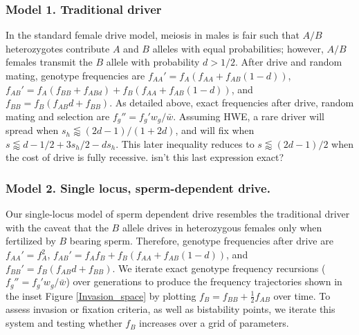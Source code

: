 \documentclass[12pt,letterpaper]{article}
\newcommand{\gc}[1]{{ \color{red} #1}}
\newcommand{\yb}[1]{{ \color{blue} #1}}
\begin{document}
\subsubsection*{Model 1. Traditional driver}
In the standard female drive model, meiosis in males is fair such that $A/B$ heterozygotes contribute $A$ and $B$ alleles with equal probabilities; however, $A/B$ females transmit the $B$ allele with probability $d>1/2$. 
After drive and random mating, genotype frequencies are 
	$f_{AA}'=f_A (f_{AA }+ f_{AB} (1 - d))$, 
	$f_{AB}'=f_A (f_{BB} + f_{ABd}) + f_B (f_{AA} + f_{AB} (1 - d))$,
	and $f_{BB}= f_B (f_{AB} d + f_{BB})$. 
As detailed above, exact frequencies after drive, random mating and selection are $f_g''= f_g'w_g/\bar{w}$. 
Assuming HWE, a rare driver will spread when $s_h
        \lessapprox(2d-1)/(1+2d)$, and will fix when $s\lessapprox d -1/2 +
        3 s_h /2- d s_h$. This later inequality reduces to
        $s\lessapprox(2d-1)/2$ when the cost of drive is fully
        recessive. \gc{isn't this last expression exact?}
	
\subsubsection*{Model 2. Single locus, sperm-dependent drive.}
Our single-locus model of sperm dependent drive resembles the traditional driver with the caveat that the $B$ allele drives in heterozygous females only when fertilized by $B$ bearing sperm. 
Therefore, genotype frequencies after drive are 
	$f_{AA}'=f_A^2$, 
	$f_{AB}'=f_A f_B+f_B (f_{AA} + f_{AB}(1 - d)) $,
	and $f_{BB}'= f_B (f_{AB} d + f_{BB} )$. 
We iterate exact genotype frequency recursions ($f_g''= f_g'w_g/\bar{w}$) over generations to produce the frequency trajectories shown in the inset
Figure \ref{Invasion_space} by plotting \gc{$f_B=f_{BB}+ \frac{1}{2}f_{AB}$}
over time. %
 \gc{To assess invasion or fixation criteria, \yb{as well as bistability points,} we iterate this system and
testing whether $f_B$ increases over a grid of parameters. }
\end{document}
